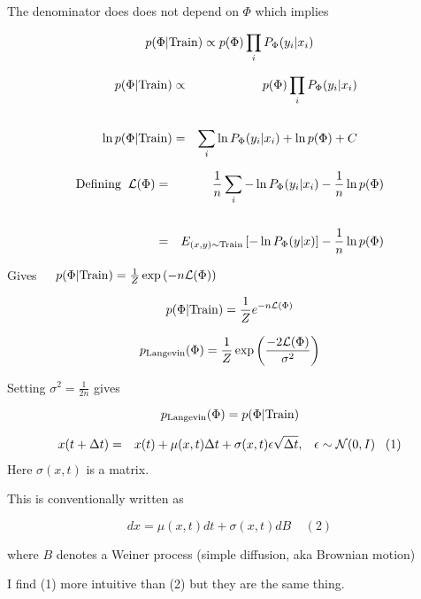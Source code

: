 {\vfill
The denominator does does not depend on $\Phi$ which implies

$$p(\Phi|\mathrm{Train}) \propto p(\Phi)\prod_i P_\Phi(y_i|x_i)$$



{\huge
\begin{eqnarray*}
p(\Phi|\mathrm{Train}) & \propto & p(\Phi)\prod_i P_\Phi(y_i|x_i) \\
\\
\ln p(\Phi|\mathrm{Train}) & = & \sum_i \ln P_\Phi(y_i|x_i) + \ln p(\Phi) + C
\end{eqnarray*}

\vfill
\begin{eqnarray*}
\mathrm{Defining}\;\;{\cal L}(\Phi) & = & \frac{1}{n} \sum_i -\ln P_\Phi(y_i|x_i) - \frac{1}{n} \ln p(\Phi) \\
\\
& = & E_{(x,y) \sim \mathrm{Train}}\left[ -\ln P_\Phi(y|x)\right] - \frac{1}{n} \ln p(\Phi)
\end{eqnarray*}

\vfill
\centerline{Gives{\color{red} $~\;\;\;p(\Phi|\mathrm{Train}) = \frac{1}{Z}\exp\left(-n{\cal L}(\Phi)\right)$}}
}







$$p(\Phi|\mathrm{Train}) = \frac{1}{Z}e^{-n{\cal L}(\Phi)}$$

\vfill
$$p_{\mathrm{Langevin}}(\Phi) = \frac{1}{Z}\exp\left(\frac{-2{\cal L}(\Phi)}{\sigma^2}\right)$$

\vfill
Setting $\sigma^2 = \frac{1}{2n}$ gives

\vfill
$$p_{\mathrm{Langevin}}(\Phi) = p(\Phi|\mathrm{Train})$$


{\huge
\begin{eqnarray*}
x(t + \Delta t) &  =  & x(t) + \mu(x,t)\Delta t + \sigma(x,t)\epsilon \sqrt{\Delta t},\;\;\;\epsilon \sim {\cal N}(0,I)\;\;\;(1)
 \end{eqnarray*}
}
\vfill
Here $\sigma(x,t)$ is a matrix.

\vfill
This is conventionally written as

$$dx = \mu(x,t)dt + \sigma(x,t)dB\;\;\;\;(2)$$

\vfill
where $B$ denotes a Weiner process (simple diffusion, aka Brownian motion)

\vfill
I find (1) more intuitive than (2) but they are the same thing.

}
